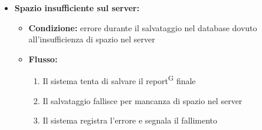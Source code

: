 \documentclass[a4paper, 11pt]{article}
\begin{document}
\begin{itemize}
\begin{itemize}
\begin{itemize}
				\item \textbf{Flusso:} 
				\begin{enumerate}
					\item L'orchestratore valida i report\textsuperscript{G} ricevuti
					\item Un report\textsuperscript{G} risulta non valido
					\item Il sistema registra l'errore
				\end{enumerate}
			\end{itemize}
		\item \textbf{Spazio insufficiente sul server:} 
			\begin{itemize}
				\item \textbf{Condizione:} errore durante il salvataggio nel database dovuto all'insufficienza di spazio nel server
				\item \textbf{Flusso:} 
				\begin{enumerate}
					\item Il sistema tenta di salvare il report\textsuperscript{G} finale
					\item Il salvataggio fallisce per mancanza di spazio nel server
					\item Il sistema registra l'errore e segnala il fallimento
				\end{enumerate}
			\end{itemize}
	\end{itemize}
\end{itemize}
\end{document}

